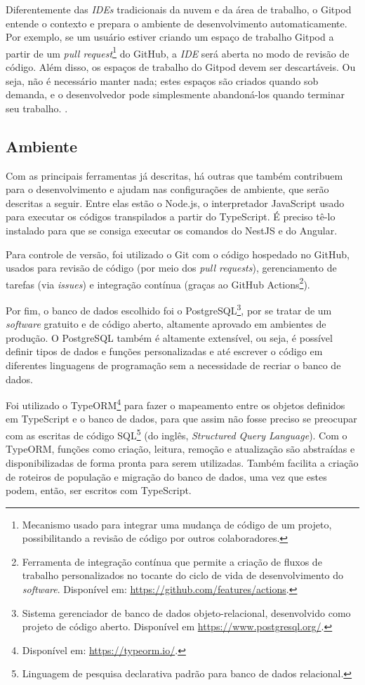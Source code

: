 Diferentemente das \textit{IDEs} tradicionais da nuvem e da área de trabalho, o Gitpod entende o contexto e prepara o ambiente de desenvolvimento automaticamente. Por exemplo, se um usuário estiver criando um espaço de trabalho Gitpod a partir de um \textit{pull request}\footnote{Mecanismo usado para integrar uma mudança de código de um projeto, possibilitando a revisão de código por outros colaboradores.} do GitHub, a \textit{IDE} será aberta no modo de revisão de código. Além disso, os espaços de trabalho do Gitpod devem ser descartáveis. Ou seja, não é necessário manter nada; estes espaços são criados quando sob demanda, e o desenvolvedor pode simplesmente abandoná-los quando terminar seu trabalho. \cite{typefox2020Gitpod}.

\subsection{Ambiente}
\label{ssec:Ambiente}
Com as principais ferramentas já descritas, há outras que também contribuem para o desenvolvimento e ajudam nas configurações de ambiente, que serão descritas a seguir. Entre elas estão o Node.js, o interpretador JavaScript usado para executar os códigos transpilados a partir do TypeScript. É preciso tê-lo instalado para que se consiga executar os comandos do NestJS e do Angular.

Para controle de versão, foi utilizado o Git com o código hospedado no GitHub, usados para revisão de código (por meio dos \textit{pull requests}), gerenciamento de tarefas (via \textit{issues}) e integração contínua (graças ao GitHub Actions\footnote{Ferramenta de integração contínua que permite a criação de fluxos de trabalho personalizados no tocante do ciclo de vida de desenvolvimento do \textit{software}. Disponível em: \url{https://github.com/features/actions}.}).

Por fim, o banco de dados escolhido foi o PostgreSQL\footnote{Sistema gerenciador de banco de dados objeto-relacional, desenvolvido como projeto de código aberto. Disponível em \url{https://www.postgresql.org/}.}, por se tratar de um \textit{software} gratuito e de código aberto, altamente aprovado em ambientes de produção. O PostgreSQL também é altamente extensível, ou seja, é possível definir tipos de dados e funções personalizadas e até escrever o código em diferentes linguagens de programação sem a necessidade de recriar o banco de dados.

Foi utilizado o TypeORM\footnote{Disponível em: \url{https://typeorm.io/}.} para fazer o mapeamento entre os objetos definidos em TypeScript e o banco de dados, para que assim não fosse preciso se preocupar com as escritas de código SQL\footnote{Linguagem de pesquisa declarativa padrão para banco de dados relacional.} (do inglês, \textit{Structured Query Language}). Com o TypeORM, funções como criação, leitura, remoção e atualização são abstraídas e disponibilizadas de forma pronta para serem utilizadas. Também facilita a criação de roteiros de população e migração do banco de dados, uma vez que estes podem, então, ser escritos com TypeScript.
